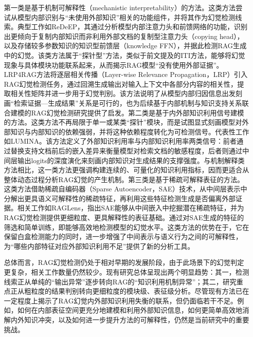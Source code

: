 第一类是基于机制可解释性（mechanistic interpretability）的方法。这类方法尝试从模型内部识别与“未使用外部知识”相关的功能组件，并将其作为幻觉检测线索。典型工作如ReDeEP\cite{sun2025redeep}，其通过分析模型内部注意力头和前馈网络的功能，识别出更倾向于复制内部知识而非利用外部文档的复制型注意力头（copying head），以及存储较多参数知识的知识型前馈层（knowledge FFN），并据此检测RAG生成中的幻觉。该类方法属于“探针型”方法，类似于前文提及的ITI\cite{li2023inference}方法，能够将幻觉现象与具体模块功能联系起来，从而揭示RAG模型“没有使用外部证据”。LRP4RAG\cite{hu2025lrp4rag}方法将逐层相关传播（Layer-wise Relevance Propagation，LRP）引入RAG幻觉检测任务，通过回溯生成输出对输入上下文中各部分内容的相关性，提取相关性矩阵并进一步用于幻觉判别。该方法说明了从模型内部归因信息出发刻画“检索证据—生成结果”关系是可行的，也为后续基于内部机制与知识支持关系联合建模的RAG幻觉检测研究提供了启发。第二类是基于内外部知识利用信号建模的方法。这类方法不再局限于单一或某类“探针”模块，而是试图显式刻画模型对外部知识与内部知识的依赖强弱，并将这种依赖程度转化为可检测信号。代表性工作如LUMINA\cite{yeh2025lumina}。该方法定义了外部知识利用率与内部知识利用率两类信号：前者通过替换支持文档前后的嵌入差异来衡量模型对检索文档的敏感程度，后者则通过中间层输出logits的深度演化来刻画内部知识对生成结果的支撑强度。与机制解释类方法相比，这一类方法更强调构建连续的、可量化的知识利用指标，因而更适合从整体动态过程分析RAG幻觉的产生机制。第三类是基于稀疏可解释表征的方法。这类方法借助稀疏自编码器（Sparse Autoencoder，SAE）\cite{shu2025survey,cunningham2023sparse,xiong2025toward}技术，从中间层表示中分解出更具语义可解释性的稀疏特征，再利用这些特征检测生成是否偏离外部证据。相关工作如RAGLens\cite{xiong2025toward}，指出SAE能够从中间嵌入中挖掘潜在稀疏特征，并为RAG幻觉检测提供更细粒度、更具解释性的表征基础。通过对SAE生成的特征的筛选和简单训练，即能够高效地检测模型的幻觉水平。这类方法的优势在于，它在保留白盒检测能力的同时，进一步增强了中间表示与语义行为之间的可解释性，为“哪些内部特征对应外部知识利用不足”提供了新的分析工具。


总体而言，RAG幻觉检测仍处于相对早期的发展阶段，由于此场景下的幻觉判定更复杂，相关工作数量仍然较少。现有研究总体呈现出两个明显趋势：其一，检测线索正从单纯的“输出异常”逐步转向RAG的“知识利用机制异常”；其二，研究重点正从粗粒度的结果判别转向更细粒度的模块级、表征级分析。尽管现有方法已在一定程度上揭示了RAG幻觉内外部知识利用失衡的联系，但仍面临若干不足。例如，如何在内部表征空间更充分地建模和利用外部知识信息，如何更简单高效地消解内外知识冲突，以及如何进一步提升方法的可解释性，仍然是当前研究中的重要挑战。

